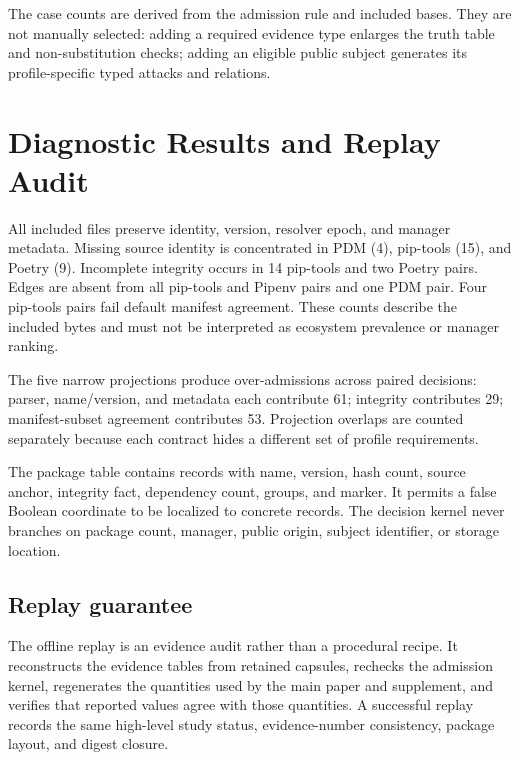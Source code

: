 \documentclass[10pt,conference]{IEEEtran}
\begin{document}
\begin{table}[t]
\caption{Construct-validation outcomes. The intended relation is pass equals cases; bold pass counts mark suites with complete oracle agreement.}
\centering\small

\end{table}

The case counts are derived from the admission rule and included bases. They are not manually selected: adding a required evidence type enlarges the truth table and non-substitution checks; adding an eligible public subject generates its profile-specific typed attacks and relations.

\section{Diagnostic Results and Replay Audit}
All included files preserve identity, version, resolver epoch, and manager metadata. Missing source identity is concentrated in PDM (4), pip-tools (15), and Poetry (9). Incomplete integrity occurs in 14 pip-tools and two Poetry pairs. Edges are absent from all pip-tools and Pipenv pairs and one PDM pair. Four pip-tools pairs fail default manifest agreement. These counts describe the included bytes and must not be interpreted as ecosystem prevalence or manager ranking.

The five narrow projections produce \ProjectionOver{} over-admissions across \ProjectionDecisions{} paired decisions: parser, name/version, and metadata each contribute 61; integrity contributes 29; manifest-subset agreement contributes 53. Projection overlaps are counted separately because each contract hides a different set of profile requirements.

\begin{table}[t]
\caption{Consumer-proxy comparison. Rows are read within each consumer; lower over-admission is stronger, and bold zero marks no over-admitted subject/profile cells for that proxy.}
\centering\small

\end{table}

The package table contains \PackageCount{} records with name, version, hash count, source anchor, integrity fact, dependency count, groups, and marker. It permits a false Boolean coordinate to be localized to concrete records. The decision kernel never branches on package count, manager, public origin, subject identifier, or storage location.

\subsection{Replay guarantee}
The offline replay is an evidence audit rather than a procedural recipe. It reconstructs the evidence tables from retained capsules, rechecks the admission kernel, regenerates the quantities used by the main paper and supplement, and verifies that reported values agree with those quantities. A successful replay records the same high-level study status, evidence-number consistency, package layout, and digest closure.
\end{document}
